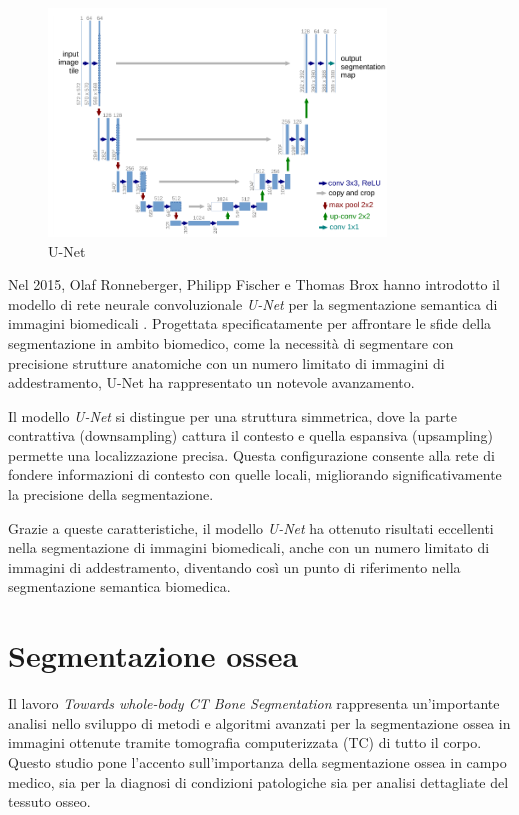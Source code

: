 \begin{figure}[!ht]
	\begin{center}
		\includegraphics[width=0.8\textwidth]{Immagini/unet.png}
	\end{center}
	\caption{U-Net}\label{fig:unet}
\end{figure}


Nel 2015, Olaf Ronneberger, Philipp Fischer e Thomas Brox hanno introdotto il modello di rete
neurale convoluzionale \textit{U-Net} per la segmentazione semantica di immagini biomedicali
\cite{ronneberger2015unet}. Progettata specificatamente per affrontare le sfide della segmentazione
in ambito biomedico, come la necessità di segmentare con precisione strutture anatomiche con un
numero limitato di immagini di addestramento, U-Net ha rappresentato un notevole avanzamento.

Il modello \textit{U-Net} si distingue per una struttura simmetrica, dove la parte contrattiva
(downsampling) cattura il contesto e quella espansiva (upsampling) permette una localizzazione
precisa. Questa configurazione consente alla rete di fondere informazioni di contesto con quelle
locali, migliorando significativamente la precisione della segmentazione.

Grazie a queste caratteristiche, il modello \textit{U-Net} ha ottenuto risultati eccellenti nella
segmentazione di immagini biomedicali, anche con un numero limitato di immagini di addestramento,
diventando così un punto di riferimento nella segmentazione semantica biomedica.



\section{Segmentazione ossea} \label{sec:segmentazione_ossea}

Il lavoro \textit{Towards whole-body CT Bone Segmentation} \cite{10.1007/978-3-662-56537-7_59}
rappresenta un'importante analisi nello sviluppo di metodi e algoritmi avanzati per la segmentazione
ossea in immagini ottenute tramite tomografia computerizzata (TC) di tutto il corpo. Questo studio
pone l'accento sull'importanza della segmentazione ossea in campo medico, sia per la diagnosi di
condizioni patologiche sia per analisi dettagliate del tessuto osseo.


